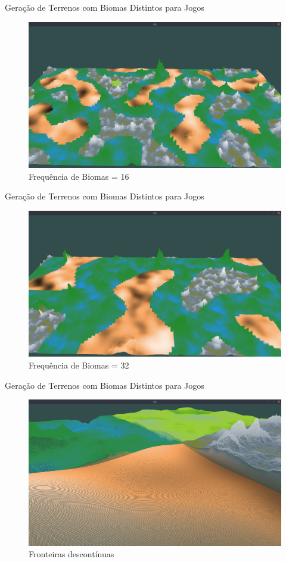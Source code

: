 \begin{frame}{Geração de Terrenos com Biomas Distintos para Jogos}
  \begin{figure}
		\centering
        \includegraphics[width=.8\textwidth]{img/uffs/16b32.png}
        \caption{Frequência de Biomas = 16}
  \end{figure}
\end{frame}

\begin{frame}{Geração de Terrenos com Biomas Distintos para Jogos}
  \begin{figure}
		\centering
        \includegraphics[width=.8\textwidth]{img/uffs/32b32.png}
        \caption{Frequência de Biomas = 32}
  \end{figure}
\end{frame}

\begin{frame}{Geração de Terrenos com Biomas Distintos para Jogos}
  \begin{figure}
		\centering
        \includegraphics[width=.8\textwidth]
        {img/uffs/interpolationArea/notinter.png}
        \caption{Fronteiras descontínuas}
  \end{figure}
\end{frame}

